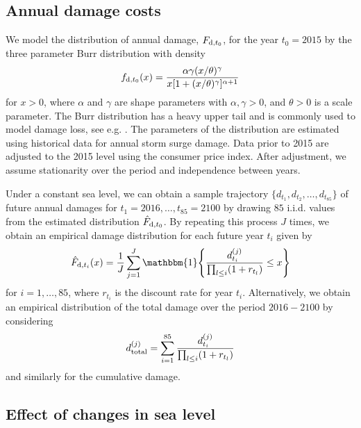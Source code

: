 \documentclass[note,screen,british,11pt]{nrdoc}
\begin{document}
\subsection{Annual damage costs} 

We model the distribution of annual damage, $F_{\textup{d}, t_0}$, for the year $t_0 = 2015$ by the three parameter Burr distribution \citep{Burr1942} with density
  \begin{equation}\label{eq:Burr}
  f_{\textup{d}, t_0} (x) = \frac{\alpha \gamma (x/ \theta)^{\gamma}}{x [ 1 + (x/ \theta)^{\gamma}]^{\alpha + 1}}
  \end{equation}
for $x > 0$, where $\alpha$ and $\gamma$ are shape parameters with $\alpha, \gamma > 0$, and $\theta >0$ is a scale parameter. The Burr distribution has a heavy upper tail and is commonly used to model damage loss, see e.g. \cite{Klugman&2012}. The parameters of the distribution are estimated using historical data for annual storm surge damage. Data prior to 2015 are adjusted to the 2015 level using the consumer price index. After adjustment, we assume stationarity over the period and independence between years.

Under a constant sea level, we can obtain a sample trajectory $\{d_{t_1}, d_{t_2}, \ldots, d_{t_{85}}\}$ of future annual damages for $t_1 = 2016, \ldots, t_{85} = 2100$ by drawing $85$ i.i.d. values from the estimated distribution $\hat{F}_{\textup{d}, t_0}$.  By repeating this process $J$ times, we obtain an empirical damage distribution for each future year $t_i$ given by
  \[
  \hat{F}_{\textup{d}, t_i} (x) = \frac{1}{J} \sum_{j=1}^J \mathbbm{1}\Bigg\{ \frac{d_{t_i}^{(j)}}{\prod_{l \leq i} (1 + r_{t_l}) } \leq x \Bigg\}
  \]
for $i = 1, \ldots, 85$, where $r_{t_i}$ is the discount rate for year $t_i$. Alternatively, we obtain an empirical distribution of the total damage over the period $2016-2100$ by considering
  \[
  d_{\textup{total}}^{(j)} = \sum_{i=1}^{85} \frac{d_{t_i}^{(j)}}{\prod_{l \leq i} (1 + r_{t_l})}
  \]
and similarly for the cumulative damage.  

\subsection{Effect of changes in sea level}
\end{document}
